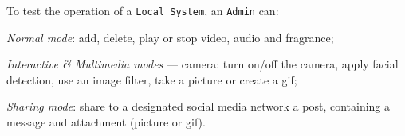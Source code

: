 To test the operation of a \texttt{Local System}, an \texttt{Admin} can:
\begin{item-c}
\item \emph{Normal mode}: add, delete, play or stop video, audio and fragrance;
\item \emph{Interactive \& Multimedia modes} --- camera: turn on/off the camera, apply facial
  detection, use an image filter, take a picture or create a \gls{gif};
\item \emph{Sharing mode}: share to a designated social media network a post,
  containing a message and attachment (picture or \gls{gif}). 
\end{item-c}
%
%
%

